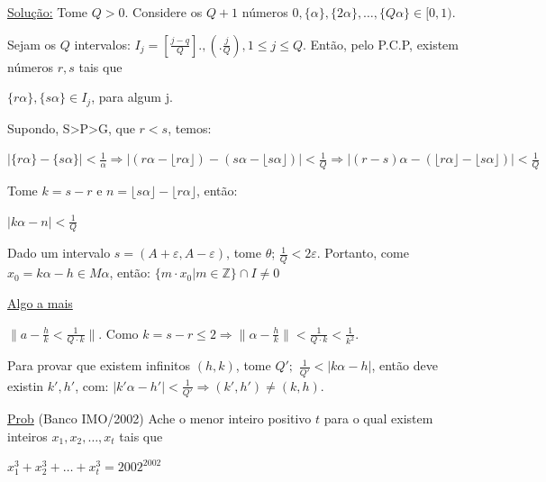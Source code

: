 \documentclass[a4paper,12pt]{article}
\renewcommand{\epsilon}{\ensuremath{\varepsilon}}
\renewcommand{\leq}{\ensuremath{\leqslant}}
\theoremstyle{plain} %
\theoremstyle{definition} %
\theoremstyle{remark} %
\begin{document}
	\begin{framed}
		\underline{Solu\c{c}\~ao:} Tome $Q>0$. Considere os $Q+1$ n\'umeros $0,\{\alpha\}, \{2\alpha\}, \dotso, \{Q\alpha\}\in [0,1)$.
		
		Sejam os $Q$ intervalos: $I_j=\left[\frac{j-q}{Q}\right]., \left(.\frac{j}{Q}\right), 1\leq j\leq Q$. Ent\~ao, pelo P.C.P, existem n\'umeros $r,s$ tais que
		
		\begin{center}
			$\{r\alpha\}, \{s\alpha\}\in I_j$, para algum j.
		\end{center}
		
		Supondo, S>P>G, que $r<s$, temos:
		
		$|\{r\alpha\}-\{s\alpha\}|<\frac{1}{\alpha}\Rightarrow |(r\alpha-\lfloor r\alpha \rfloor)-(s\alpha-\lfloor s\alpha \rfloor)|<\frac{1}{Q}\Rightarrow |(r-s)\alpha-(\lfloor r\alpha \rfloor-\lfloor s\alpha \rfloor)|<\frac{1}{Q}$
		
		Tome $k=s-r$ e $n=\lfloor s\alpha \rfloor-\lfloor r\alpha \rfloor$, ent\~ao:
		
		\begin{center}
			$|k\alpha-n|<\frac{1}{Q}$
		\end{center}
		
		Dado um intervalo $s=(A+\epsilon, A-\epsilon)$, tome $\theta$; $\frac{1}{Q}<2\epsilon$. Portanto, come $x_0=k\alpha-h\in M\alpha$, ent\~ao: $\{m\cdot x_0 | m\in\mathds{Z}\}\cap I\neq 0$ \tiny\textblock 
		
		\normalsize
		
		\underline{Algo a mais}
		
		$\|a-\frac{h}{k}<\frac{1}{Q\cdot k}\|$. Como $k=s-r\leq 2\Rightarrow \|\alpha-\frac{h}{k}\|<\frac{1}{Q\cdot k}<\frac{1}{k^2}$. 
		
		Para provar que existem infinitos $(h, k)$, tome $Q';$ $\frac{1}{Q'}<|k\alpha-h|$, ent\~ao deve existin $k', h'$, com: $|k'\alpha-h'|<\frac{1}{Q'}\Rightarrow (k', h')\neq(k,h)$.
		
	\end{framed}
	
	\vspace{2ex}\underline{Prob} (Banco IMO/2002) Ache o menor inteiro positivo $t$ para o qual existem inteiros $x_1, x_2, \dotso, x_t$ tais que
	
	\begin{center}
		$x_1^3+x_2^3+\dotso+x_t^3=2002^{2002}$
	\end{center}
	
\end{document}
